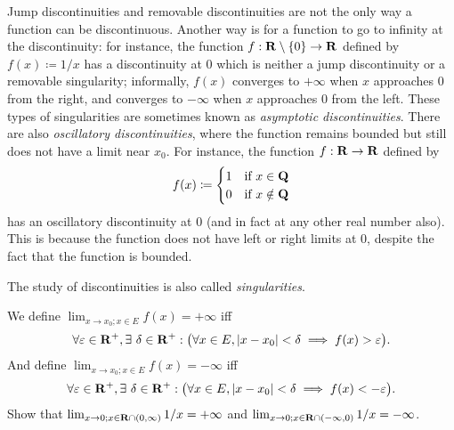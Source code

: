 \begin{remark}\label{9.5.4}
  Jump discontinuities and removable discontinuities are not the only way a function can be discontinuous.
  Another way is for a function to go to infinity at the discontinuity:
  for instance, the function \(f : \mathbf{R} \setminus \{0\} \to \mathbf{R}\) defined by \(f(x) \coloneqq 1 / x\) has a discontinuity at \(0\) which is neither a jump discontinuity or a removable singularity;
  informally, \(f(x)\) converges to \(+\infty\) when \(x\) approaches \(0\) from the right, and converges to \(-\infty\) when \(x\) approaches \(0\) from the left.
  These types of singularities are sometimes known as \emph{asymptotic discontinuities}.
  There are also \emph{oscillatory discontinuities}, where the function remains bounded but still does not have a limit near \(x_0\).
  For instance, the function \(f : \mathbf{R} \to \mathbf{R}\) defined by
  \[
    f(x) \coloneqq \begin{cases}
      1 & \text{if } x \in \mathbf{Q}    \\
      0 & \text{if } x \notin \mathbf{Q}
    \end{cases}
  \]
  has an oscillatory discontinuity at \(0\) (and in fact at any other real number also).
  This is because the function does not have left or right limits at \(0\), despite the fact that the function is bounded.
\end{remark}

\begin{note}
  The study of discontinuities is also called \emph{singularities}.
\end{note}

\begin{additional corollary}\label{ac 9.5.2}
We define \(\lim_{x \to x_0 ; x \in E} f(x) = +\infty\) iff
\[
  \forall \varepsilon \in \R^+, \exists\ \delta \in \R^+ : \big(\forall x \in E, \abs{x - x_0} < \delta \implies f(x) > \varepsilon\big).
\]
And define \(\lim_{x \to x_0 ; x \in E} f(x) = -\infty\) iff
\[
  \forall \varepsilon \in \R^+, \exists\ \delta \in \R^+ : \big(\forall x \in E, \abs{x - x_0} < \delta \implies f(x) < -\varepsilon\big).
\]
Show that \(\lim_{x \to 0 ; x \in \mathbf{R} \cap (0, \infty)} 1 / x = +\infty\) and \(\lim_{x \to 0 ; x \in \mathbf{R} \cap (-\infty, 0)} 1 / x = -\infty\).
\end{additional corollary}

